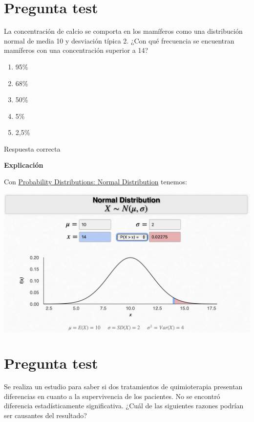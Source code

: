 \documentclass[
]{book}
\providecommand{\tightlist}{%
  \setlength{\itemsep}{0pt}\setlength{\parskip}{0pt}}
\begin{document}
\hypertarget{pregunta-test-109}{%
\section{Pregunta test}\label{pregunta-test-109}}

La concentración de calcio se comporta en los mamíferos como una distribución normal de media 10 y desviación típica 2. ¿Con qué frecuencia se encuentran mamíferos con una concentración superior a 14?

\begin{enumerate}
\def\labelenumi{\alph{enumi})}
\tightlist
\item
  95\%
\item
  68\%
\item
  50\%
\item
  5\%
\item
  2,5\%
\end{enumerate}

Respuesta correcta

\textbf{Explicación}

Con \href{https://homepage.divms.uiowa.edu/~mbognar/applets/normal.html}{Probability Distributions: Normal Distribution} tenemos:

\includegraphics[width=20.78in]{img/3_3}

\hypertarget{pregunta-test-110}{%
\section{Pregunta test}\label{pregunta-test-110}}

Se realiza un estudio para saber si dos tratamientos de quimioterapia presentan diferencias en cuanto a la supervivencia de los pacientes. No se encontró diferencia estadísticamente significativa. ¿Cuál de las siguientes razones podrían ser causantes del resultado?
\end{document}
